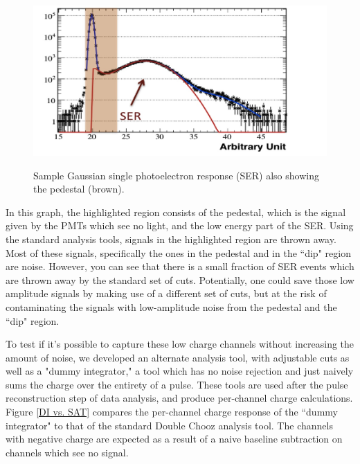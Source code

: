 \begin{figure}
\caption{Sample Gaussian single photoelectron response (SER) also showing the pedestal (brown).}
\includegraphics[width=\textwidth]{DC_Results/Gaussian_SER.jpg}
\label {Gaussian SER}
\end{figure}

In this graph, the highlighted region consists of the pedestal, which is the signal given by the PMTs which see no light, and the low energy part of the SER. Using the standard analysis tools, signals in the highlighted region are thrown away. Most of these signals, specifically the ones in the pedestal and in the ``dip" region are noise. However, you can see that there is a small fraction of SER events which are thrown away by the standard set of cuts. Potentially, one could save those low amplitude signals by making use of a different set of cuts, but at the risk of  contaminating the signals with low-amplitude noise from the pedestal and the ``dip" region.

To test if it's possible to capture these low charge channels without increasing the amount of noise, we developed an alternate analysis tool, with adjustable cuts as well as a "dummy integrator," a tool which has no noise rejection and just naively sums the charge over the entirety of a pulse. These tools are used after the pulse reconstruction step of data analysis, and produce per-channel charge calculations. Figure \ref{DI vs. SAT} compares the per-channel charge response of the ``dummy integrator" to that of the standard Double Chooz analysis tool. The channels with negative charge are expected as a result of a naive baseline subtraction on channels which see no signal. 

